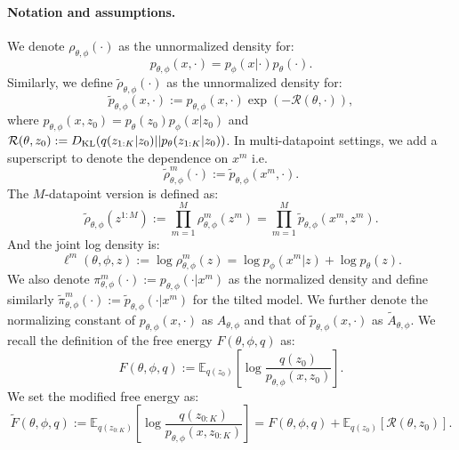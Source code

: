 \paragraph{Notation and assumptions.} We denote ${\rho}_{\theta,\phi}(\cdot)$ as the unnormalized density for:
\begin{equation}
    {p}_{\theta,\phi}(x,\cdot)=p_{\phi}(x|\cdot)p_\theta(\cdot).
\end{equation}
Similarly, we define $\tilde{\rho}_{\theta,\phi}(\cdot)$ as the unnormalized density for:
\begin{equation}
    \tilde{p}_{\theta,\phi}(x,\cdot):=p_{\theta,\phi}(x,\cdot)\exp(-\mathcal{R}(\theta,\cdot)),
\end{equation}
where $p_{\theta,\phi}(x,z_0)=p_{\theta}(z_0) p_\phi(x|z_0)$ and $\mathcal{R}(\theta, z_0) := D_{\mathrm{KL}}(q(z_{1:K}|z_{0})||p_{\theta}(z_{1:K}|z_{0}))$. In multi-datapoint settings, we add a superscript to denote the dependence on $x^m$ i.e. 
\begin{equation}
    \tilde\rho^m_{\theta,\phi}(\cdot):=\tilde p_{\theta,\phi}(x^m,\cdot).
\end{equation}
The $M$-datapoint version is defined as:
\begin{equation}
    \tilde{\rho}_{\theta,\phi}(z^{1:M}):=\prod_{m=1}^M\rho^m_{\theta,\phi}(z^m)=\prod_{m=1}^M \tilde{p}_{\theta,\phi}(x^m,z^m).
\end{equation}
And the joint log density is:
\begin{equation}
    \ell^m(\theta,\phi,z):=\log \rho^m_{\theta,\phi}(z)=\log p_{\phi}(x^m|z)+\log p_\theta(z).
\end{equation}
We also denote $\pi_{\theta,\phi}^m(\cdot):={p}_{\theta,\phi}(\cdot|x^m)$ as the normalized density and define similarly $\tilde \pi_{\theta,\phi}^m(\cdot):={\tilde p}_{\theta,\phi}(\cdot|x^m)$ for the tilted model.
We further denote the normalizing constant of ${p}_{\theta,\phi}(x,\cdot)$ as $A_{\theta,\phi}$ and that of $\tilde{p}_{\theta,\phi}(x,\cdot)$ as $\tilde{A}_{\theta,\phi}$. 
We recall the definition of the free energy $F(\theta, \phi,q)$ as:
\begin{equation}
    {F}(\theta, \phi, q) := \mathbb{E}_{q(z_0)}\left[
   \log \frac{q(z_{0})}{p_{\theta, \phi}( x, z_{0})}
   \right].
\end{equation}
We set the modified free energy as:
\begin{equation}
   \tilde{F}(\theta, \phi, q) := \mathbb{E}_{q(z_{0:K})}\left[ \log \frac{q(z_{0:K})}{p_{\theta, \phi}( x, z_{0:K})} \right]=F(\theta, \phi,q) + \mathbb{E}_{q(z_0)}\left[\mathcal{R}(\theta, z_0) 
   \right].
\end{equation}

